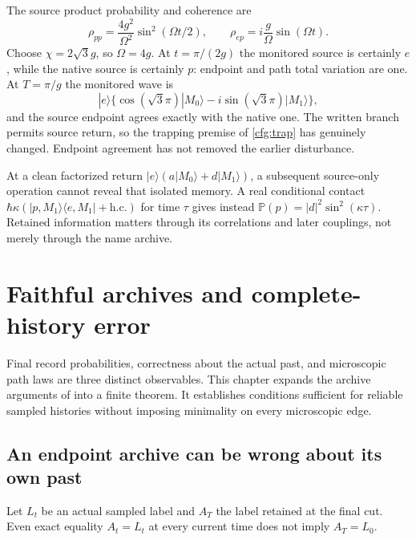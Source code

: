 \documentclass[11pt,oneside,openany]{book}
\theoremstyle{definition}
\theoremstyle{remark}\newtheorem{remark}[theorem]{Remark}
\begin{document}
The source product probability and coherence are
\[
 \rho_{pp}=\frac{4g^2}{\Omega^2}\sin^2(\Omega t/2),\qquad
 \rho_{ep}=i\frac g\Omega\sin(\Omega t).
\]
Choose $\chi=2\sqrt3g$, so $\Omega=4g$.
At $t=\pi/(2g)$ the monitored source is certainly $e$, while the native
source is certainly $p$: endpoint and path total variation are one.
At $T=\pi/g$ the monitored wave is
\[
 |e\rangle\{\cos(\sqrt3\pi)|M_0\rangle
            -i\sin(\sqrt3\pi)|M_1\rangle\},
\]
and the source endpoint agrees exactly with the native one.
The written branch permits source return, so the trapping premise of
\eqref{cfg:trap} has genuinely changed. Endpoint agreement has not removed
the earlier disturbance.

At a clean factorized return $|e\rangle(a|M_0\rangle+d|M_1\rangle)$,
a subsequent source-only operation cannot reveal that isolated memory.
A real conditional contact
$\hbar\kappa(|p,M_1\rangle\langle e,M_1|+\mathrm{h.c.})$
for time $\tau$ gives instead
$\mathbb P(p)=|d|^2\sin^2(\kappa\tau)$.
Retained information matters through its correlations and later couplings,
not merely through the name archive.

\chapter{Faithful archives and complete-history error}
\label{cfg:archives}

Final record probabilities, correctness about the actual past, and
microscopic path laws are three distinct observables. This chapter expands
the archive arguments of \cite{C02,C03} into a finite theorem. It establishes
conditions sufficient for reliable sampled histories without imposing
minimality on every microscopic edge.

\section{An endpoint archive can be wrong about its own past}

Let $L_t$ be an actual sampled label and $A_T$ the label retained at the
final cut. Even exact equality $A_t=L_t$ at every current time does not
imply $A_T=L_0$.
\end{document}

